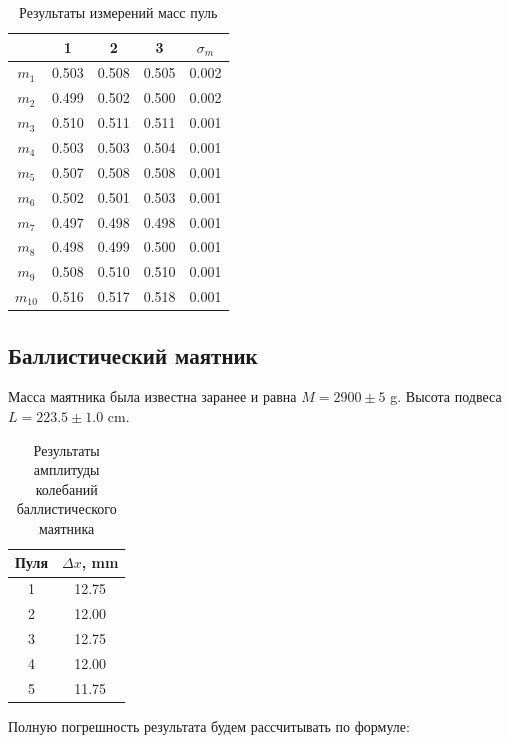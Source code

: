 \documentclass[a4paper,12pt]{article}
\begin{document}
	\begin{table}[H]
		\centering
		\begin{tabular}{|c|c|c|c|c|}
			\hline
			& 1 & 2 & 3 & $\sigma_m$ \\
			\hline
			$m_1$ & 0.503 & 0.508 & 0.505 & 0.002 \\
			\hline
			$m_2$ & 0.499 & 0.502 & 0.500 & 0.002 \\
			\hline
			$m_3$ & 0.510 & 0.511 & 0.511 & 0.001 \\
			\hline
			$m_4$ & 0.503 & 0.503 & 0.504 & 0.001 \\
			\hline
			$m_5$ & 0.507 & 0.508 & 0.508 & 0.001 \\
			\hline
			$m_6$ & 0.502 & 0.501 & 0.503 & 0.001 \\
			\hline
			$m_7$ & 0.497 & 0.498 & 0.498 & 0.001 \\
			\hline
			$m_8$ & 0.498 & 0.499 & 0.500 & 0.001 \\
			\hline
			$m_9$ & 0.508 & 0.510 & 0.510 & 0.001 \\
			\hline
			$m_{10}$ & 0.516 & 0.517 & 0.518 & 0.001 \\
			\hline
		\end{tabular}
		\caption{Результаты измерений масс пуль}
	\end{table}	
	
	\subsection{Баллистический маятник}
	
	Масса маятника была известна заранее и равна $M=2900\pm5$ g. Высота подвеса $L=223.5\pm1.0$ cm.\\
	
	\begin{table}[H]
		\centering
		\begin{tabular}{|c|c|}
			\hline
			Пуля & $\Delta x$, mm \\
			\hline
			1 & 12.75 \\
			\hline
			2 & 12.00 \\
			\hline
			3 & 12.75 \\
			\hline
			4 & 12.00 \\
			\hline
			5 & 11.75 \\
			\hline
		\end{tabular}
		\caption{Результаты амплитуды колебаний баллистического маятника}
	\end{table}
	
	Полную погрешность результата будем рассчитывать по формуле:
	
\end{document}
